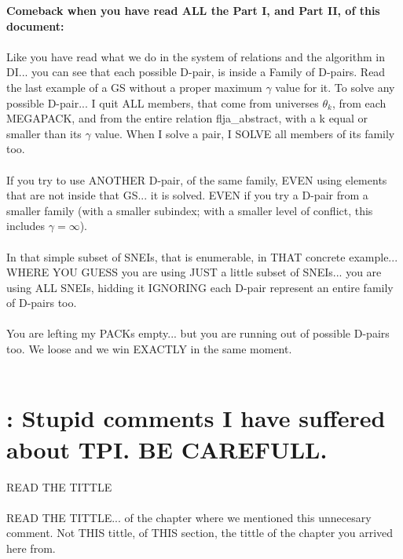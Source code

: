 		\noindent
		\textbf{Comeback when you have read ALL the Part I, and Part II, of this document:}
		\\\\
		
		\noindent
		Like you have read what we do in the system of relations and the algorithm in DI... you can see that each possible D-pair, is inside a Family of D-pairs. Read the last example of a GS without a proper maximum $\gamma$ value for it. To solve any possible D-pair... I quit ALL members, that come from universes $\theta_{k}$, from each MEGAPACK, and from the entire relation flja\_abstract, with a k equal or smaller than its $\gamma$ value. When I solve a pair, I SOLVE all members of its family too.
		\\\\
		
		\noindent
		If you try to use ANOTHER D-pair, of the same family, EVEN using elements that are not inside that GS... it is solved. EVEN if you try a D-pair from a smaller family (with a smaller subindex; with a smaller level of conflict, this includes $\gamma=\infty$).
		\\\\
		
		\noindent
		In that simple subset of SNEIs, that is enumerable, in THAT concrete example... WHERE YOU GUESS you are using JUST a little subset of SNEIs... you are using ALL SNEIs, hidding it IGNORING each D-pair represent an entire family of D-pairs too.
		\\\\
		
		\noindent
		You are lefting my PACKs empty... but you are running out of possible D-pairs too. We loose and we win EXACTLY in the same moment.
		\\\\
		
	\newpage
	\section{\:: Stupid comments I have suffered about TPI. BE CAREFULL.}
	
		\noindent
		READ THE TITTLE
		\\\\
		
		\noindent
		READ THE TITTLE... of the chapter where we mentioned this unnecesary comment. Not THIS tittle, of THIS section, the tittle of the chapter you arrived here from.
		\\\\
		
